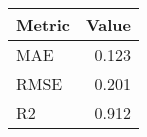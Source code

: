 \begin{tabular}{lr}
\toprule
Metric & Value \\
\midrule
MAE & 0.123 \\
RMSE & 0.201 \\
R2 & 0.912 \\
\bottomrule
\end{tabular}
